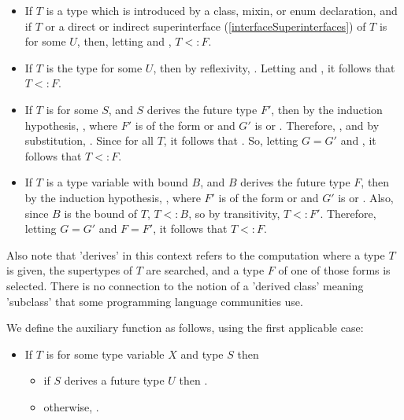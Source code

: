 \documentclass[makeidx]{article}
\begin{document}
{{\begin{itemize}
\item
  If $T$ is a type which is introduced by
  a class, mixin, or enum declaration,
  and if $T$ or a direct or indirect superinterface
  (\ref{interfaceSuperinterfaces})
  of $T$ is  for some $U$, then, letting
   and , $T <: F$.
\item
  If $T$ is the type  for some $U$, then by reflexivity,
  . Letting  and
  , it follows that $T <: F$.
\item
  If $T$ is  for some $S$, and
  $S$ derives the future type $F'$,
  then by the induction hypothesis, , where $F'$ is of the form
   or  and $G'$ is  or
  . Therefore, , and by substitution,
  . Since  for all $T$, it follows that
  . So, letting $G = G'$ and ,
  it follows that $T <: F$.
\item
  If $T$ is a type variable with bound $B$, and
  $B$ derives the future type $F$,
  then by the induction hypothesis, , where $F'$ is of the form
   or  and $G'$ is  or
  . Also, since $B$ is the bound of $T$, $T <: B$, so by
  transitivity, $T <: F'$. Therefore, letting $G = G'$ and $F = F'$, it
  follows that $T <: F$.
\end{itemize}

Also note that 'derives' in this context refers to the computation
where a type $T$ is given, the supertypes of $T$ are searched,
and a type $F$ of one of those forms is selected.
There is no connection to the notion of a 'derived class' meaning 'subclass'
that some programming language communities use.%
}

\LMHash{}%
We define the auxiliary function
as follows, using the first applicable case:

\begin{itemize}
\item If $T$ is 
  for some type variable $X$ and type $S$ then
  \begin{itemize}
  \item if $S$ derives a future type $U$
    then .
  \item otherwise,
    .
  \end{itemize}


\end{itemize}}
\end{document}
